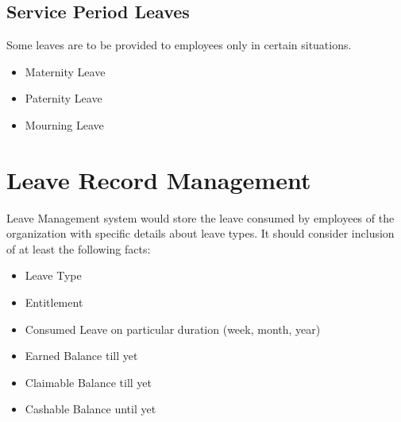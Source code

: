 \documentclass[letterpaper,10pt,english]{sphinxmanual}
\begin{document}
\subsection{Service Period Leaves}
\label{\detokenize{leave-holiday/leave-types:service-period-leaves}}
Some leaves are to be provided to employees only in certain situations.
\begin{itemize}
\item {} 
Maternity Leave

\item {} 
Paternity Leave

\item {} 
Mourning Leave

\end{itemize}


\section{Leave Record Management}
\label{\detokenize{leave-holiday/leave-configuration:leave-record-management}}\label{\detokenize{leave-holiday/leave-configuration::doc}}
Leave Management system would store the leave consumed by employees of the organization with specific details about leave types. It should consider inclusion of at least the following facts:
\begin{itemize}
\item {} 
Leave Type

\item {} 
Entitlement

\item {} 
Consumed Leave  on particular duration (week, month, year)

\item {} 
Earned Balance till yet

\item {} 
Claimable Balance till yet

\item {} 
Cashable Balance until yet

\end{itemize}
\end{document}
